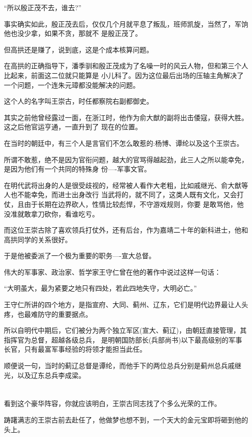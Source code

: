 \documentclass[11pt,a4paper,onecolumn]{article}
\begin{document}
``所以殷正茂不去，谁去?''

事实确实如此，殷正茂去后，仅仅几个月就平息了叛乱，班师凯旋，当然了，军饷他也没少拿，如果不贪，那就不
是殷正茂了。

但高拱还是赚了，说到底，这是个成本核算问题。

在高拱的正确指导下，潘季驯和殷正茂成为了名噪一时的风云人物，但和第三个人比起来，前面这二位就只能算是
小儿科了。因为这位最后出场的压轴主角解决了一个问题，一个连朱元璋都没能解决的问题。

这个人的名字叫王崇古，时任都察院右副都御史。

其实之前他曾经露过一面，在浙江时，他作为俞大猷的副将出击倭寇，获得大胜。这之后他官运亨通，一直升到了
现在的位置。

在当时的朝廷中，有三个人是言官们不怎么敢惹的:杨博、谭纶以及这个王崇古。

所谓不敢惹，绝不是因为官衔问题，越大的官骂得越起劲，此三人之所以能幸免，是因为他们有一个共同的特殊身
份----军事文官。

在明代武将出身的人是很受歧视的，经常被人看作大老粗，比如戚继光、俞大猷等人也不能幸免，而进士出身改行
当武将的，就不同了，这类人既有文化，又会打仗，且由于长期在边界砍人，性情比较彪悍，不守游戏规则，你要
是敢骂他，他没准就敢拿刀砍你，看谁吃亏。

而这位王崇古除了喜欢领兵打仗外，还有后台，作为嘉靖二十年的新科进士，他和高拱同学的关系很好。

于是他被委派了一个极为重要的职务----宣大总督。

伟大的军事家、政治家、哲学家王守仁曾在他的著作中说过这样一句话：

``大明虽大，最为紧要之地只有四处，若此四地失守，大明必亡。''

王守仁所讲的四个地方，是指宣府、大同、蓟州、辽东，它们是明代边界最让人头疼，也最难防守的重要据点。

所以自明代中期后，它们被分为两个独立军区(宣大、蓟辽)，由朝廷直接管理，其指挥官为总督，超越各级总兵，
是明朝国防部长(兵部尚书)以下最高级别的军事长官，只有最富军事经验的将领才能担当此任。

顺便说一句，当时的蓟辽总督是谭纶，而他手下的两位总兵分别是蓟州总兵戚继光，以及辽东总兵李成梁。

\section[\thesection]{}

看到这个豪华阵容，你就应该明白，王崇古同志找了个多么光荣的工作。

踌躇满志的王崇古前去赴任了，他做梦也想不到，一个天大的金元宝即将砸到他的头上。
\end{document}

